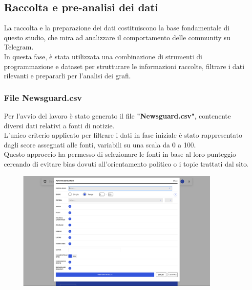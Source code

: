 \documentclass[12pt]{article}
\begin{document}
	\subsection{Raccolta e pre-analisi dei dati}
	La raccolta e la preparazione dei dati costituiscono la base fondamentale di questo studio, che mira ad analizzare il comportamento delle community su Telegram.\\
	In questa fase, è stata utilizzata una combinazione di strumenti di programmazione e dataset per strutturare le informazioni raccolte, filtrare i dati rilevanti e prepararli per l'analisi dei grafi.
	\subsubsection{File Newsguard.csv}
	Per l'avvio del lavoro è stato generato il file \textbf{"Newsguard.csv"}, contenente diversi dati relativi a fonti di notizie.\\
	L'unico criterio applicato per filtrare i dati in fase iniziale è stato rappresentato dagli score assegnati alle fonti, variabili su una scala da 0 a 100.\\
	Questo approccio ha permesso di selezionare le fonti in base al loro punteggio cercando di evitare bias dovuti all'orientamento politico o i topic trattati dal sito.
	\begin{figure}[H]
		\centering
		\includegraphics[width=0.9\textwidth]{immagini/filtro.png}
	\end{figure}
\end{document}
